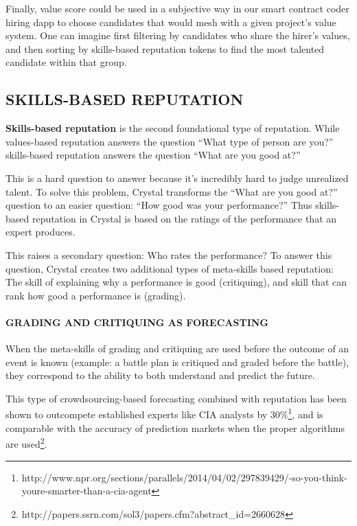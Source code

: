 Finally, value score could be used in a subjective way in our smart
contract coder hiring dapp to choose candidates that would mesh with a
given project's value system. One can imagine first filtering by
candidates who share the hirer's values, and then sorting by
skills-based reputation tokens to find the most talented candidate
within that group.

\subsection{\texorpdfstring{\protect\hypertarget{_fwpxhowvyax}{}{\protect\hypertarget{_Toc462050412}{}{}}SKILLS-BASED
REPUTATION}{SKILLS-BASED REPUTATION}}\label{skills-based-reputation}

\textbf{Skills-based reputation} is the second foundational type of
reputation. While values-based reputation answers the question ``What
type of person are you?'' skills-based reputation answers the question
``What are you good at?''

This is a hard question to answer because it's incredibly hard to judge
unrealized talent. To solve this problem, Crystal transforms the ``What
are you good at?'' question to an easier question: ``How good was your
performance?'' Thus skills-based reputation in Crystal is based on the
ratings of the performance that an expert produces.

This raises a secondary question: Who rates the performance? To answer
this question, Crystal creates two additional types of meta-skills based
reputation: The skill of explaining why a performance is good
(critiquing), and skill that can rank how good a performance is
(grading).

\paragraph{GRADING AND CRITIQUING AS
FORECASTING}\label{grading-and-critiquing-as-forecasting}

When the meta-skills of grading and critiquing are used before the
outcome of an event is known (example: a battle plan is critiqued and
graded before the battle), they correspond to the ability to both
understand and predict the future.

This type of crowdsourcing-based forecasting combined with reputation
has been shown to outcompete established experts like CIA analysts by
30\%\footnote{http://www.npr.org/sections/parallels/2014/04/02/297839429/-so-you-think-youre-smarter-than-a-cia-agent},
and is comparable with the accuracy of prediction markets when the
proper algorithms are used\footnote{http://papers.ssrn.com/sol3/papers.cfm?abstract\_id=2660628}.


